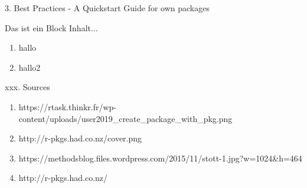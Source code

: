 \documentclass[11pt,a4paper]{beamer}
\begin{document}

\begin{frame}[t]{3. Best Practices - A Quickstart Guide for own packages }
	
	\begin{block}{Das ist ein Block}
		Inhalt...
	\end{block}
	
	\begin{enumerate}
		\item hallo
		\item hallo2
	\end{enumerate}

\end{frame}









\begin{frame}[t]{xxx. Sources }
	

	
	\begin{enumerate}
		\item https://rtask.thinkr.fr/wp-content/uploads/user2019\_create\_package\_with\_pkg.png
		\item http://r-pkgs.had.co.nz/cover.png
		\item https://methodsblog.files.wordpress.com/2015/11/stott-1.jpg?w=1024\&h=464
		\item http://r-pkgs.had.co.nz/
	\end{enumerate}
	
\end{frame}
\end{document}
